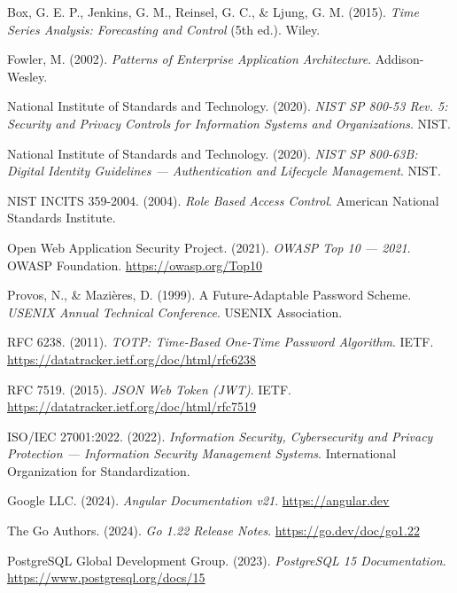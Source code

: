 \documentclass[12pt,a4paper,oneside]{report}
\begin{document}
\begin{enumerate}[leftmargin=1.5cm, label={[\arabic*]}]
  \item Box, G. E. P., Jenkins, G. M., Reinsel, G. C., \& Ljung, G. M. (2015). \textit{Time Series Analysis: Forecasting and Control} (5th ed.). Wiley.
  \item Fowler, M. (2002). \textit{Patterns of Enterprise Application Architecture}. Addison-Wesley.
  \item National Institute of Standards and Technology. (2020). \textit{NIST SP 800-53 Rev. 5: Security and Privacy Controls for Information Systems and Organizations}. NIST.
  \item National Institute of Standards and Technology. (2020). \textit{NIST SP 800-63B: Digital Identity Guidelines — Authentication and Lifecycle Management}. NIST.
  \item NIST INCITS 359-2004. (2004). \textit{Role Based Access Control}. American National Standards Institute.
  \item Open Web Application Security Project. (2021). \textit{OWASP Top 10 — 2021}. OWASP Foundation. \url{https://owasp.org/Top10}
  \item Provos, N., \& Mazières, D. (1999). A Future-Adaptable Password Scheme. \textit{USENIX Annual Technical Conference}. USENIX Association.
  \item RFC 6238. (2011). \textit{TOTP: Time-Based One-Time Password Algorithm}. IETF. \url{https://datatracker.ietf.org/doc/html/rfc6238}
  \item RFC 7519. (2015). \textit{JSON Web Token (JWT)}. IETF. \url{https://datatracker.ietf.org/doc/html/rfc7519}
  \item ISO/IEC 27001:2022. (2022). \textit{Information Security, Cybersecurity and Privacy Protection — Information Security Management Systems}. International Organization for Standardization.
  \item Google LLC. (2024). \textit{Angular Documentation v21}. \url{https://angular.dev}
  \item The Go Authors. (2024). \textit{Go 1.22 Release Notes}. \url{https://go.dev/doc/go1.22}
  \item PostgreSQL Global Development Group. (2023). \textit{PostgreSQL 15 Documentation}. \url{https://www.postgresql.org/docs/15}
\end{enumerate}
\end{document}
